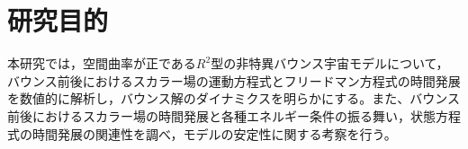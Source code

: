 \section{研究目的}
本研究では，空間曲率が正である$R^2$型の非特異バウンス宇宙モデルについて，バウンス前後におけるスカラー場の運動方程式とフリードマン方程式の時間発展を数値的に解析し，バウンス解のダイナミクスを明らかにする。また、バウンス前後におけるスカラー場の時間発展と各種エネルギー条件の振る舞い，状態方程式の時間発展の関連性を調べ，モデルの安定性に関する考察を行う。